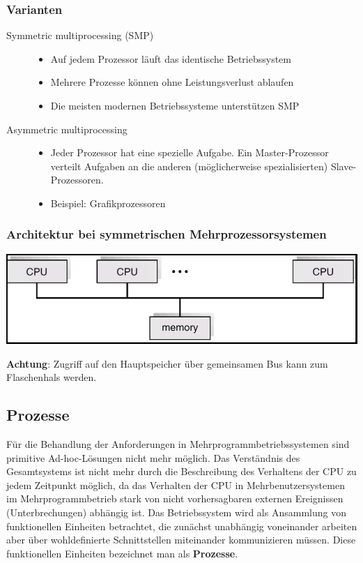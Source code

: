 \documentclass[11pt]{article}
\begin{document}
\subsubsection*{Varianten}
\label{sec:org5087024}
\begin{description}
\item[{Symmetric multiprocessing (SMP)}] \begin{itemize}
\item Auf jedem Prozessor läuft das identische Betriebssystem
\item Mehrere Prozesse können ohne Leistungsverlust ablaufen
\item Die meisten modernen Betriebssysteme unterstützen SMP
\end{itemize}
\item[{Asymmetric multiprocessing}] \begin{itemize}
\item Jeder Prozessor hat eine spezielle Aufgabe. Ein Master-Prozessor
verteilt Aufgaben an die anderen (möglicherweise spezialisierten)
 Slave- Prozessoren.
\item Beispiel: Grafikprozessoren
\end{itemize}
\end{description}
\subsubsection*{Architektur bei symmetrischen Mehrprozessorsystemen}
\label{sec:org9df2dff}
\begin{center}
\includegraphics[width=.9\linewidth]{./Abbildungen/mehrprozessorarchitektur.png}
\end{center}

\textbf{Achtung}: Zugriff auf den Hauptspeicher über gemeinsamen Bus kann zum
Flaschenhals werden.

\subsection*{Prozesse}
\label{sec:org00ceb1b}
Für die Behandlung der Anforderungen in Mehrprogrammbetriebssystemen
sind primitive Ad-hoc-Lösungen nicht mehr möglich. Das Verständnis des
Gesamtsystems ist nicht mehr durch die Beschreibung des Verhaltens der
CPU zu jedem Zeitpunkt möglich, da das Verhalten der CPU in
Mehrbenutzersystemen im Mehrprogrammbetrieb stark von nicht
vorhersagbaren externen Ereignissen (Unterbrechungen) abhängig ist. Das
Betriebssystem wird als Ansammlung von funktionellen Einheiten
betrachtet, die zunächst unabhängig voneinander arbeiten aber über
wohldefinierte Schnittstellen miteinander kommunizieren müssen. Diese
funktionellen Einheiten bezeichnet man als \textbf{Prozesse}.
\end{document}
